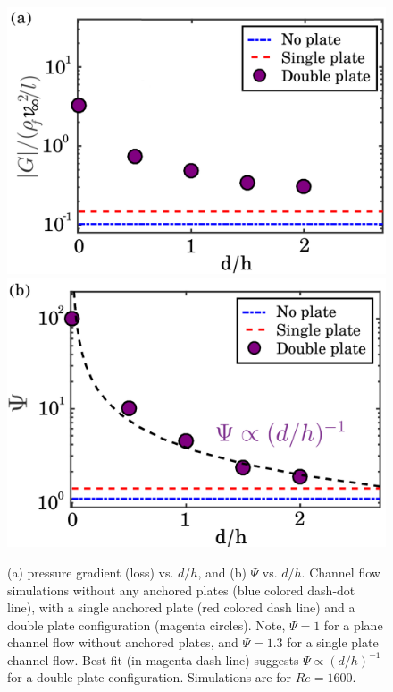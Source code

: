 \documentclass[aps,pre,twocolumn,aps,longbibliography]{revtex4-1}
\begin{document}
	
	\begin{figure}
		\begin{minipage}[c]{1\linewidth}
			\includegraphics[width=0.95\linewidth]{Fig20a.pdf} \\
			\includegraphics[width=0.95\linewidth]{Fig20b.pdf} 
		\end{minipage} 
		\caption{(a) pressure gradient (loss) vs. $d/h$, and (b) $\Psi$ vs. $d/h$. Channel flow simulations without any anchored plates (blue colored dash-dot line), with a single anchored plate (red colored dash line) and a double plate configuration (magenta circles). Note, $\Psi=1$ for a plane channel flow without anchored plates, and $\Psi=1.3$ for a single plate channel flow. Best fit (in magenta dash line) suggests $\Psi\propto (d/h)^{-1}$ for a double plate configuration. Simulations are for $Re=1600$.}
		\label{fig:core_BL_vs_Re2} 
	\end{figure} 
	
\end{document}
